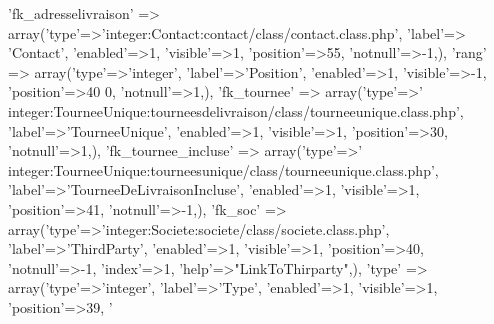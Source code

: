 \begin{DoxyCode}
        \textcolor{stringliteral}{'fk\_adresselivraison'} => array(\textcolor{stringliteral}{'type'}=>\textcolor{stringliteral}{'integer:Contact:contact/class/contact.class.php'}, \textcolor{stringliteral}{'label'}=>\textcolor{stringliteral}{
      'Contact'}, \textcolor{stringliteral}{'enabled'}=>1, \textcolor{stringliteral}{'visible'}=>1, \textcolor{stringliteral}{'position'}=>55, \textcolor{stringliteral}{'notnull'}=>-1,),
        \textcolor{stringliteral}{'rang'} => array(\textcolor{stringliteral}{'type'}=>\textcolor{stringliteral}{'integer'}, \textcolor{stringliteral}{'label'}=>\textcolor{stringliteral}{'Position'}, \textcolor{stringliteral}{'enabled'}=>1, \textcolor{stringliteral}{'visible'}=>-1, \textcolor{stringliteral}{'position'}=>40
      0, \textcolor{stringliteral}{'notnull'}=>1,),
        \textcolor{stringliteral}{'fk\_tournee'} => array(\textcolor{stringliteral}{'type'}=>\textcolor{stringliteral}{'
      integer:TourneeUnique:tourneesdelivraison/class/tourneeunique.class.php'}, \textcolor{stringliteral}{'label'}=>\textcolor{stringliteral}{'TourneeUnique'}, \textcolor{stringliteral}{'enabled'}=>1, \textcolor{stringliteral}{'visible'}=>1, \textcolor{stringliteral}{'position'}=>30, \textcolor{stringliteral}{'notnull'}=>1,),
        \textcolor{stringliteral}{'fk\_tournee\_incluse'} => array(\textcolor{stringliteral}{'type'}=>\textcolor{stringliteral}{'
      integer:TourneeUnique:tourneesunique/class/tourneeunique.class.php'}, \textcolor{stringliteral}{'label'}=>\textcolor{stringliteral}{'TourneeDeLivraisonIncluse'}, \textcolor{stringliteral}{'enabled'}=>1, \textcolor{stringliteral}{'visible'}=>1, \textcolor{stringliteral}{'position'}=>41, \textcolor{stringliteral}{'notnull'}=>-1,),
        \textcolor{stringliteral}{'fk\_soc'} => array(\textcolor{stringliteral}{'type'}=>\textcolor{stringliteral}{'integer:Societe:societe/class/societe.class.php'}, \textcolor{stringliteral}{'label'}=>\textcolor{stringliteral}{'ThirdParty'},
       \textcolor{stringliteral}{'enabled'}=>1, \textcolor{stringliteral}{'visible'}=>1, \textcolor{stringliteral}{'position'}=>40, \textcolor{stringliteral}{'notnull'}=>-1, \textcolor{stringliteral}{'index'}=>1, \textcolor{stringliteral}{'help'}=>\textcolor{stringliteral}{"LinkToThirparty"},),
        \textcolor{stringliteral}{'type'} => array(\textcolor{stringliteral}{'type'}=>\textcolor{stringliteral}{'integer'}, \textcolor{stringliteral}{'label'}=>\textcolor{stringliteral}{'Type'}, \textcolor{stringliteral}{'enabled'}=>1, \textcolor{stringliteral}{'visible'}=>1, \textcolor{stringliteral}{'position'}=>39, \textcolor{stringliteral}{'
}
\end{DoxyCode}
